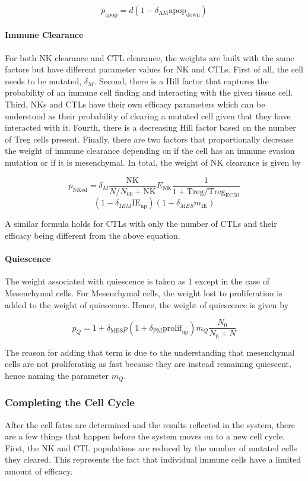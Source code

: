 \documentclass{article}
\begin{document}
$$ p_{\text{apop}} = d(1-\delta_{\text{AM}}\text{apop}_{\text{down}}) $$

\paragraph{Immune Clearance}
For both NK clearance and CTL clearance, the weights are built with the same factors but have different parameter values for NK and CTLs.
First of all, the cell needs to be mutated, $\delta_M$.
Second, there is a Hill factor that captures the probability of an immune cell finding and interacting with the given tissue cell.
Third, NKs and CTLs have their own efficacy parameters which can be understood as their probability of clearing a mutated cell given that they have interacted with it.
Fourth, there is a decreasing Hill factor based on the number of Treg cells present.
Finally, there are two factors that proportionally decrease the weight of immune clearance depending on if the cell has an immune evasion mutation or if it is mesenchymal.
In total, the weight of NK clearance is given by

$$ p_{\text{NKed}} =  \delta_M \frac{\text{NK}}{N/N_{00}+\text{NK}} E_{\text{NK}} \frac{1}{1+\text{Treg}/\text{Treg}_{\text{EC50}}} $$ $$ (1-\delta_{IEM}\text{IE}_{\text{up}})(1-\delta_{MES}m_{\text{IE}})$$

A similar formula holds for CTLs with only the number of CTLs and their efficacy being different from the above equation.


\paragraph{Quiescence}
The weight associated with quiescence is taken as 1 except in the case of Mesenchymal cells.
For Mesenchymal cells, the weight lost to proliferation is added to the weight of quiescence.
Hence, the weight of quiescence is given by

$$ p_Q = 1 + \delta_{\text{MES}}p(1+\delta_{\text{PM}}\text{prolif}_{\text{up}})m_Q\frac{N_0}{N_0+N} $$

The reason for adding that term is due to the understanding that mesenchymal cells are not proliferating as fast because they are instead remaining quiescent, hence naming the parameter $m_Q$.

\subsubsection{Completing the Cell Cycle}
After the cell fates are determined and the results reflected in the system, there are a few things that happen before the system moves on to a new cell cycle.
First, the NK and CTL populations are reduced by the number of mutated cells they cleared.
This represents the fact that individual immune cells have a limited amount of efficacy.
\end{document}
